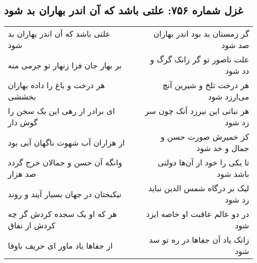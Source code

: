 \begin{center}
\section*{غزل شماره ۷۵۶: علتی باشد که آن اندر بهاران بد شود}
\label{sec:0756}
\begin{longtable}{l p{0.5cm} r}
علتی باشد که آن اندر بهاران بد شود
&&
گر زمستان بد بود اندر بهاران صد شود
\\
بر بهار جان فزا زنهار تو جرمی منه
&&
علت ناصور تو گر زانک گرگ و دد شود
\\
هر درخت و باغ را داده بهاران بخششی
&&
هر درخت تلخ و شیرین آنچ می‌ارزد شود
\\
ای برادر از رهی این یک سخن را گوش دار
&&
هر نباتی این نیرزد آنک چون سر زد شود
\\
از هزاران آب شهوت ناگهان آبی بود
&&
کز خمیرش صورت حسن و جمال و خد شود
\\
وانگه آن حسن و جمالان خرج گردد صد هزار
&&
تا یکی را خود از آن‌ها دولتی باشد شود
\\
نیکبختان در جهان بسیار آیند و روند
&&
لیک بر درگاه شمس الدین نباید رد شود
\\
هر که او یک سجده کردش گر چه کردش از نفاق
&&
در دو عالم عاقبت او خاصه ایزد شود
\\
از جفاها یاد ماور ای حریف باوفا
&&
زانک یاد آن جفاها در ره تو سد شود
\\
\end{longtable}
\end{center}
